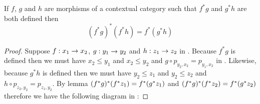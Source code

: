 \begin{lemma}
If $f$, $g$ and $h$ are morphisms of a contextual category \catcw such that $f^*g$ and $g^*h$ are both defined then
\begin{equation}
\label{stardistributesonmorphisms}
(f^*g)^*(f^*h)=f^*(g^*h)
\end{equation}
\end{lemma}
\begin{proof}

Suppose $f: x_1 \rightarrow x_2$, $g:y_1 \rightarrow y_2$ and $h:z_1 \rightarrow z_2$ in \catc. 
Because $f^*g$ is defined then we must have $x_2 \leq y_1$ and  $x_2 \leq y_2$ and $g \circ p_{y_2,x_2} = p_{y_1,x_2}$ in \catc. 
Likewise, because $g^*h$ is defined then we must have $y_2 \leq z_1$ and  $y_2 \leq z_2$ and $h \circ p_{z_2,y_2} = p_{z_1,y_2}$.
By lemma  $(f^*g)^*(f^*z_1)=f^*(g^*z_1)$ and $(f^*g)^*(f^*z_2)=f^*(g^*z_2)$
therefore we have the following diagram in \catc:


\end{proof}
